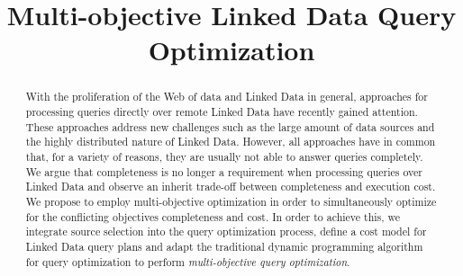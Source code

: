 \documentclass{sig-alternate}
\title{Multi-objective Linked Data Query Optimization}
\author{
}
\begin{document}
\maketitle
\begin{abstract} 
  With the proliferation of the Web of data and Linked Data in
  general, approaches for processing queries directly over remote
  Linked Data have recently gained attention. These approaches address
  new challenges such as the large amount of data sources and the
  highly distributed nature of Linked Data. However, all approaches
  have in common that, for a variety of reasons, they are usually not
  able to answer queries completely. We argue that completeness is no
  longer a requirement when processing queries over Linked Data and
  observe an inherit trade-off between completeness and execution
  cost. We propose to employ multi-objective optimization in order to
  simultaneously optimize for the conflicting objectives completeness
  and cost. In order to achieve this, we integrate source selection
  into the query optimization process, define a cost model for Linked
  Data query plans and adapt the traditional dynamic programming
  algorithm for query optimization to perform \emph{multi-objective
    query optimization}. 

\end{abstract}





%







%
\end{document}
